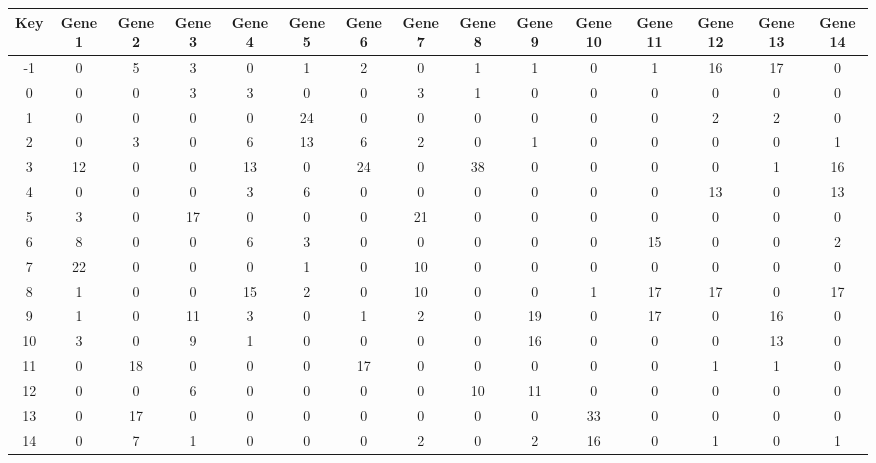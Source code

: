 \begin{tabular}{|c|c|c|c|c|c|c|c|c|c|c|c|c|c|c|}
\hline
Key & Gene 1 & Gene 2 & Gene 3 & Gene 4 & Gene 5 & Gene 6 & Gene 7 & Gene 8 & Gene 9 & Gene 10 & Gene 11 & Gene 12 & Gene 13 & Gene 14 \\
\hline
-1 & 0 & 5 & 3 & 0 & 1 & 2 & 0 & 1 & 1 & 0 & 1 & 16 & 17 & 0 \\
0 & 0 & 0 & 3 & 3 & 0 & 0 & 3 & 1 & 0 & 0 & 0 & 0 & 0 & 0 \\
1 & 0 & 0 & 0 & 0 & 24 & 0 & 0 & 0 & 0 & 0 & 0 & 2 & 2 & 0 \\
2 & 0 & 3 & 0 & 6 & 13 & 6 & 2 & 0 & 1 & 0 & 0 & 0 & 0 & 1 \\
3 & 12 & 0 & 0 & 13 & 0 & 24 & 0 & 38 & 0 & 0 & 0 & 0 & 1 & 16 \\
4 & 0 & 0 & 0 & 3 & 6 & 0 & 0 & 0 & 0 & 0 & 0 & 13 & 0 & 13 \\
5 & 3 & 0 & 17 & 0 & 0 & 0 & 21 & 0 & 0 & 0 & 0 & 0 & 0 & 0 \\
6 & 8 & 0 & 0 & 6 & 3 & 0 & 0 & 0 & 0 & 0 & 15 & 0 & 0 & 2 \\
7 & 22 & 0 & 0 & 0 & 1 & 0 & 10 & 0 & 0 & 0 & 0 & 0 & 0 & 0 \\
8 & 1 & 0 & 0 & 15 & 2 & 0 & 10 & 0 & 0 & 1 & 17 & 17 & 0 & 17 \\
9 & 1 & 0 & 11 & 3 & 0 & 1 & 2 & 0 & 19 & 0 & 17 & 0 & 16 & 0 \\
10 & 3 & 0 & 9 & 1 & 0 & 0 & 0 & 0 & 16 & 0 & 0 & 0 & 13 & 0 \\
11 & 0 & 18 & 0 & 0 & 0 & 17 & 0 & 0 & 0 & 0 & 0 & 1 & 1 & 0 \\
12 & 0 & 0 & 6 & 0 & 0 & 0 & 0 & 10 & 11 & 0 & 0 & 0 & 0 & 0 \\
13 & 0 & 17 & 0 & 0 & 0 & 0 & 0 & 0 & 0 & 33 & 0 & 0 & 0 & 0 \\
14 & 0 & 7 & 1 & 0 & 0 & 0 & 2 & 0 & 2 & 16 & 0 & 1 & 0 & 1 \\
\hline
\end{tabular}